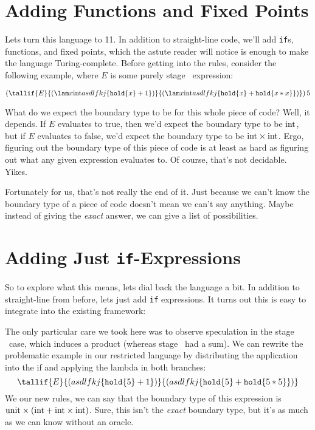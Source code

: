 \documentclass[]{article}
\newcommand {\next}{asdlfkj}
\begin{document}
\begin{abstrsyn}
\section{Adding Functions and Fixed Points}

Lets turn this language to 11.  
In addition to straight-line code, we'll add \texttt{if}s, functions, and fixed points,
which the astute reader will notice is enough to make the language Turing-complete.
Before getting into the rules, consider the following example, 
where $E$ is some purely stage \bbone\ expression:

\[
\left(
\tallif {E}
	{(\lam x \rmint {\next\{\pause\{x\}+1\})}}
	{(\lam x \rmint {\next\{\pause\{x\}+\pause\{x*x\}\}})}
\right ) 5
\]

What do we expect the boundary type to be for this whole piece of code?
Well, it depends. 
If $E$ evaluates to true, then we'd expect the boundary type to be ${\rm int}$,
but if $E$ evaluates to false, we'd expect the boundary type to be ${\rm int} \times {\rm int}$.
Ergo, figuring out the boundary type of this piece of code is at least as hard 
as figuring out what any given expression evaluates to.
Of course, that's not decidable. Yikes. 

Fortunately for us, that's not really the end of it.  
Just because we can't know the boundary type of a piece of code doesn't mean we can't say anything.  
Maybe instead of giving the {\em exact} answer, we can give a list of possibilities.

\section{Adding Just \texttt{if}-Expressions}

So to explore what this means, lets dial back the language a bit.  
In addition to straight-line from before, lets just add \texttt{if} expressions.
It turns out this is easy to integrate into the existing framework:


The only particular care we took here was to observe speculation in the stage \bbtwo\ case,
which induces a product (whereas stage \bbone\ had a sum).
We can rewrite the problematic example in our restricted language 
by distributing the application into the if and applying the lambda in both branches:
\[
\tallif {E}
	{(\next\{\pause\{5\}+1\})}
	{(\next\{\pause\{5\}+\pause\{5*5\}\})}
\]
We our new rules, we can say that the boundary type of this expression is
${\rm unit} \times ({\rm int} + {\rm int} \times {\rm int})$.
Sure, this isn't the {\em exact} boundary type, 
but it's as much as we can know without an oracle.


\end{abstrsyn}
\end{document}

